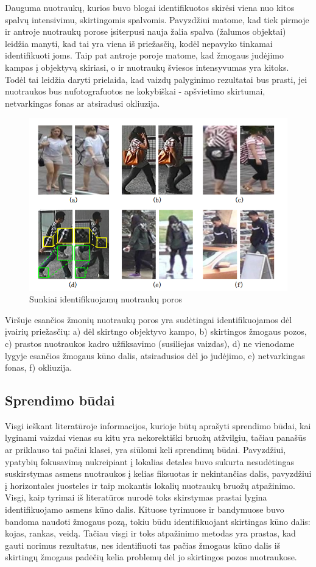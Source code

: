 \documentclass{VUMIFPSkursinis}
\begin{document}
Dauguma nuotraukų, kurios buvo blogai identifikuotos skirėsi viena nuo kitos spalvų intensivimu, skirtingomis spalvomis. Pavyzdžiui matome, kad tiek pirmoje ir antroje nuotraukų porose įsiterpusi nauja žalia spalva (žalumos objektai) leidžia manyti, kad tai yra viena iš priežasčių, kodėl nepavyko tinkamai identifikuoti joms. Taip pat antroje poroje matome, kad žmogaus judėjimo kampas į objektyvą skiriasi, o ir nuotraukų šviesos intensyvumas yra kitoks. Todėl tai leidžia daryti prielaida, kad vaizdų palyginimo rezultatai bus prasti, jei nuotraukos bus nufotografuotos ne kokybiškai - apšvietimo skirtumai, netvarkingas fonas ar atsiradusi okliuzija\cite{Person_reindentification}.

\begin{figure}[H]
\centering
\includegraphics[scale=1.0]{img/image_diff_examples.png}
\caption{Sunkiai identifikuojamų nuotraukų poros} %
\label{img:mlp}
\end{figure}
Viršuje esančios žmonių nuotraukų poros yra sudėtingai identifikuojamos dėl įvairių priežasčių: a) dėl skirtngo objektyvo kampo, b) skirtingos žmogaus pozos, c) prastos nuotraukos kadro užfiksavimo (susiliejas vaizdas), d) ne vienodame lygyje esančios žmogaus kūno dalis, atsiradusios dėl jo judėjimo, e) netvarkingas fonas, f) okliuzija.

\pagebreak
\subsection{Sprendimo būdai}
Visgi ieškant literatūroje informacijos, kurioje būtų aprašyti sprendimo būdai, kai lyginami vaizdai vienas su kitu yra nekorektiški bruožų atžvilgiu, tačiau panašūs ar priklauso tai pačiai klasei, yra siūlomi keli sprendimų būdai. Pavyzdžiui, ypatybių fokusavimą nukreipiant į lokalias detales buvo sukurta nesudėtingas suskirstymas asmens nuotraukos į kelias fiksuotas ir nekintančias dalis, pavyzdžiui į horizontales juosteles ir taip mokantis lokalių nuotraukų bruožų atpažinimo. Visgi, kaip tyrimai iš literatūros nurodė toks skirstymas prastai lygina identifikuojamo asmens kūno dalis. Kituose tyrimuose ir bandymuose buvo bandoma naudoti žmogaus pozą, tokiu būdu identifikuojant skirtingas kūno dalis: kojas, rankas, veidą. Tačiau visgi ir toks atpažinimo metodas yra prastas, kad gauti norimus rezultatus, nes identifiuoti tas pačias žmogaus kūno dalis iš skirtingų žmogaus padėčių kelia problemų dėl jo skirtingos pozos nuotraukose.
\pagebreak
\end{document}
